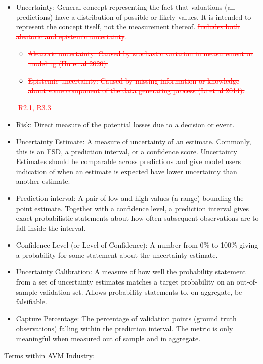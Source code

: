 \documentclass[colTwo]{anon}
\theoremstyle{definition}
\begin{document}
\begin{itemize}
\item Uncertainty: General concept representing the fact that valuations (all predictions) have a distribution of possible or likely values.  It is intended to represent the concept itself, not the measurement thereof. \textcolor{red}{\st{Includes both aleatoric and epistemic uncertainty}}.
  \begin{itemize}
    \item \textcolor{red}{\st{Aleatoric uncertainty: Caused by stochastic variation in measurement or modeling (Hu et al 2020).}}
    \item \textcolor{red}{\st{Epistemic uncertainty: Caused by missing information or knowledge about some component of the data generating process (Li et al 2014).}}
  \end{itemize}\textcolor{red}{[R2.1, R3.3]}
\item Risk: Direct measure of the potential losses due to a decision or event.
\item Uncertainty Estimate: A measure of uncertainty of an estimate. Commonly, this is an FSD, a prediction interval, or a confidence score. Uncertainty Estimates should be comparable across predictions and give model users indication of when an estimate is expected have lower uncertainty than another estimate.
\item Prediction interval: A pair of low and high values (a range) bounding the point estimate. Together with a confidence level, a prediction interval gives exact probabilistic statements about how often subsequent observations are to fall inside the interval.
\item Confidence Level (or Level of Confidence): A number from 0\% to 100\% giving a probability for some statement about the uncertainty estimate.
\item Uncertainty Calibration: A measure of how well the probability statement from a set of uncertainty estimates matches a target probability on an out-of-sample validation set. Allows probability statements to, on aggregate, be falsifiable.
\item Capture Percentage: The percentage of validation points (ground truth observations) falling within the prediction interval. The metric is only meaningful when measured out of sample and in aggregate. 
\end{itemize}

Terms within AVM Industry:
\end{document}
